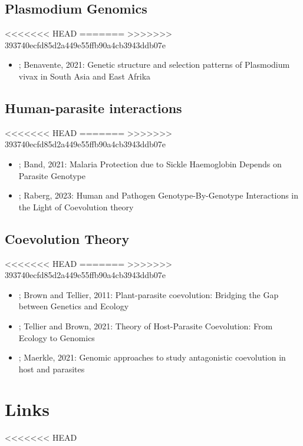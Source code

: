 \documentclass[11pt]{article}
\begin{document}
\subsection{Plasmodium Genomics}
<<<<<<< HEAD
\label{sec:orgf3857a6}
=======
\label{sec:org620d310}
>>>>>>> 393740ecfd85d2a449e55ffb90a4cb3943ddb07e
\begin{itemize}
\item \cite{benavente-2021-distin-genet}; Benavente, 2021: Genetic structure and selection patterns of Plasmodium vivax in South Asia and East Afrika
\end{itemize}

\subsection{Human-parasite interactions}
<<<<<<< HEAD
\label{sec:org0de348b}
=======
\label{sec:org45099fe}
>>>>>>> 393740ecfd85d2a449e55ffb90a4cb3943ddb07e
\begin{itemize}
\item \cite{band-2021-malar-protec}; Band, 2021: Malaria Protection due to Sickle Haemoglobin Depends on Parasite Genotype
\item \cite{raberg-2023-human-pathog}; Raberg, 2023: Human and Pathogen Genotype-By-Genotype Interactions in the Light of Coevolution theory
\end{itemize}

\subsection{Coevolution Theory}
<<<<<<< HEAD
\label{sec:org7037a4c}
=======
\label{sec:org9cc0997}
>>>>>>> 393740ecfd85d2a449e55ffb90a4cb3943ddb07e
\begin{itemize}
\item \cite{brown-2011-plant-paras-coevol}; Brown and Tellier, 2011: Plant-parasite coevolution: Bridging the Gap between Genetics and Ecology
\item \cite{tellier-2021-theor-host}; Tellier and Brown, 2021: Theory of Host-Parasite Coevolution: From Ecology to Genomics
\item \cite{maerkle-2021-novel-genom}; Maerkle, 2021: Genomic approaches to study antagonistic coevolution in host and parasites
\end{itemize}

\section{Links}
<<<<<<< HEAD
\label{sec:org6da40e4}
\end{document}
